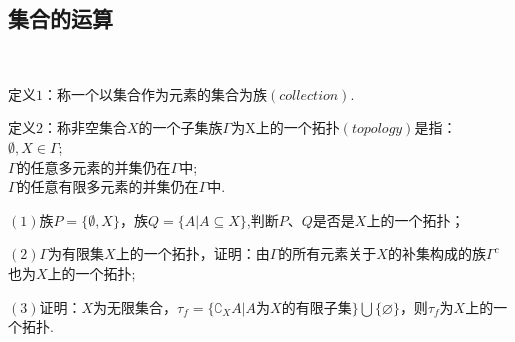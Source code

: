 \clearpage
\subsection{集合的运算}
\clearpage
\hw
\begin{homework}
    \ 

    定义$1$：称一个以集合作为元素的集合为族$(collection)$.

    定义$2$：称非空集合$X$的一个子集族$\Gamma$为X上的一个拓扑$(topology)$是指：\\
$ \emptyset,X\in \Gamma$;\\
$\Gamma$的任意多元素的并集仍在$\Gamma$中;\\
$\Gamma$的任意有限多元素的并集仍在$\Gamma$中.

    $(1)$族$P=\{\emptyset,X\}$，族$Q=\{A|A\subseteq X\}$,判断$P$、$Q$是否是$X$上的一个拓扑；
    
    $(2)$$\Gamma$为有限集$X$上的一个拓扑，证明：由\(\Gamma\)的所有元素关于$X$的补集构成的族$\Gamma^c$也为$X$上的一个拓扑;

    $(3)$证明：$X$为无限集合，$\tau_f=\{\complement_X A|A\text{为}X\text{的有限子集}\}\bigcup\{\varnothing\}$，则$\tau_f$为$X$上的一个拓扑.
\end{homework}



\clearpage


